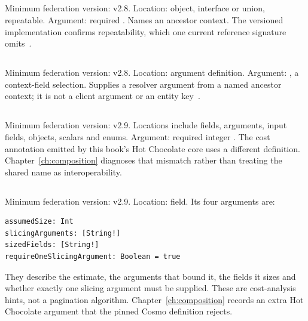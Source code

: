\subsection*{}

Minimum federation version: v2.8. Location: object, interface or union,
repeatable. Argument: required . Names an ancestor context.
The versioned implementation confirms repeatability, which one current
reference signature omits~\autocite{apollocontext28repair}.

\subsection*{}

Minimum federation version: v2.8. Location: argument definition.
Argument: , a context-field selection. Supplies a resolver
argument from a named ancestor context; it is not a client argument or an
entity key~\autocite{apollocontext28repair}.

\subsection*{}

Minimum federation version: v2.9. Locations include fields, arguments,
input fields, objects, scalars and enums. Argument: required integer
. The cost annotation emitted by this book's Hot Chocolate
core uses a different definition. Chapter~\ref{ch:composition} diagnoses
that mismatch rather than treating the shared name as interoperability.

\subsection*{}

Minimum federation version: v2.9. Location: field.
Its four arguments are:

\begin{verbatim}
assumedSize: Int
slicingArguments: [String!]
sizedFields: [String!]
requireOneSlicingArgument: Boolean = true
\end{verbatim}

They describe the estimate, the arguments that bound it, the fields it sizes
and whether exactly one slicing argument must be supplied.
These are cost-analysis hints, not a pagination algorithm.
Chapter~\ref{ch:composition} records an extra Hot Chocolate argument that the
pinned Cosmo definition rejects.

